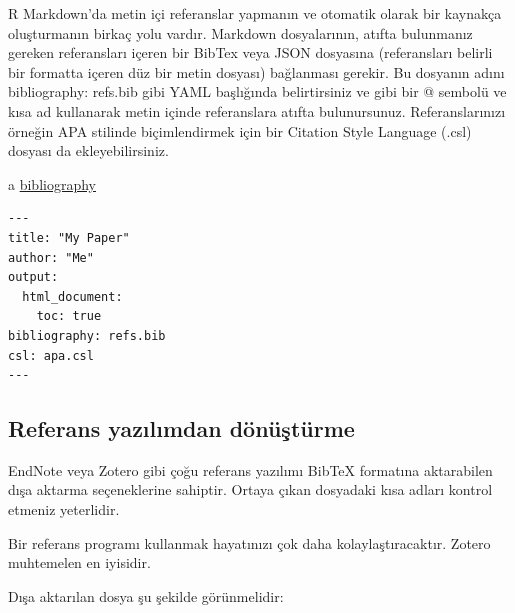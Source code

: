 \documentclass[
  oneside]{book}
\begin{document}
R Markdown'da metin içi referanslar yapmanın ve otomatik olarak bir kaynakça oluşturmanın birkaç yolu vardır. Markdown dosyalarının, atıfta bulunmanız gereken referansları içeren bir BibTex veya JSON dosyasına (referansları belirli bir formatta içeren düz bir metin dosyası) bağlanması gerekir. Bu dosyanın adını bibliography: refs.bib gibi YAML başlığında belirtirsiniz ve \citep{tidyverse} gibi bir @ sembolü ve kısa ad kullanarak metin içinde referanslara atıfta bulunursunuz. Referanslarınızı örneğin APA stilinde biçimlendirmek için bir Citation Style Language (.csl) dosyası da ekleyebilirsiniz.

a \href{https://bookdown.org/yihui/rmarkdown-cookbook/bibliography.html}{bibliography}

\begin{verbatim}
---
title: "My Paper"
author: "Me"
output:
  html_document:
    toc: true
bibliography: refs.bib
csl: apa.csl
---
\end{verbatim}

\hypertarget{referans-yazux131lux131mdan-duxf6nuxfcux15ftuxfcrme}{%
\subsection{Referans yazılımdan dönüştürme}\label{referans-yazux131lux131mdan-duxf6nuxfcux15ftuxfcrme}}

EndNote veya Zotero gibi çoğu referans yazılımı BibTeX formatına aktarabilen dışa aktarma seçeneklerine sahiptir. Ortaya çıkan dosyadaki kısa adları kontrol etmeniz yeterlidir.

\begin{warning}
Bir referans programı kullanmak hayatınızı çok daha kolaylaştıracaktır. Zotero muhtemelen en iyisidir.

\end{warning}

Dışa aktarılan dosya şu şekilde görünmelidir:
\end{document}
